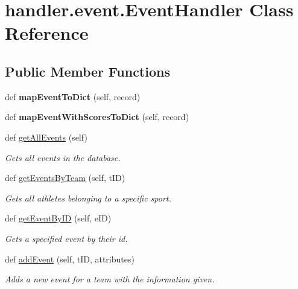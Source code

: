 \hypertarget{classhandler_1_1event_1_1_event_handler}{}\section{handler.\+event.\+Event\+Handler Class Reference}
\label{classhandler_1_1event_1_1_event_handler}
\subsection*{Public Member Functions}
\begin{DoxyCompactItemize}
\item 
\mbox{\label{classhandler_1_1event_1_1_event_handler_a5e837eb3451d29138a27d95b1ed7575d}} 
def {\bfseries map\+Event\+To\+Dict} (self, record)
\item 
\mbox{\label{classhandler_1_1event_1_1_event_handler_a75d66da35627aebf7cc6cff5cb93f6e0}} 
def {\bfseries map\+Event\+With\+Scores\+To\+Dict} (self, record)
\item 
def \hyperlink{classhandler_1_1event_1_1_event_handler_a5ea11d438c3a6c39524dcde68f87a6c2}{get\+All\+Events} (self)
\begin{DoxyCompactList}\small\item\em Gets all events in the database. \end{DoxyCompactList}\item 
def \hyperlink{classhandler_1_1event_1_1_event_handler_a0b5135c2269c49c58f165e428d7976fd}{get\+Events\+By\+Team} (self, t\+ID)
\begin{DoxyCompactList}\small\item\em Gets all athletes belonging to a specific sport. \end{DoxyCompactList}\item 
def \hyperlink{classhandler_1_1event_1_1_event_handler_ab5e4836ec9f0aea002d0be3f7227566e}{get\+Event\+By\+ID} (self, e\+ID)
\begin{DoxyCompactList}\small\item\em Gets a specified event by their id. \end{DoxyCompactList}\item 
def \hyperlink{classhandler_1_1event_1_1_event_handler_a6c97fb08cd641f3d2dd07a6b5afc0a37}{add\+Event} (self, t\+ID, attributes)
\begin{DoxyCompactList}\small\item\em Adds a new event for a team with the information given. \end{DoxyCompactList}\item 

\end{DoxyCompactItemize}
